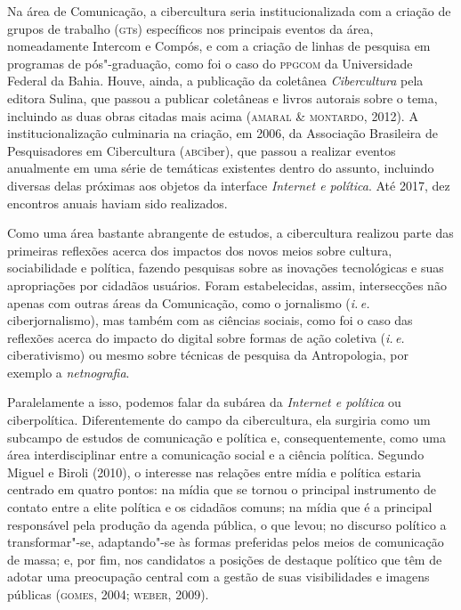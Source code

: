 {Na área de Comunicação, a cibercultura seria institucionalizada com a
criação de grupos de trabalho (\textsc{gt}s) específicos nos principais eventos
da área, nomeadamente Intercom e Compós, e com a criação de linhas de
pesquisa em programas de pós"-graduação, como foi o caso do \textsc{ppgcom} da
Universidade Federal da Bahia. Houve, ainda, a publicação da coletânea
\textit{Cibercultura} pela editora Sulina, que passou a publicar coletâneas e
livros autorais sobre o tema, incluindo as duas obras citadas mais acima
(\textsc{amaral \& montardo}, 2012). A institucionalização culminaria na criação,
em 2006, da Associação Brasileira de Pesquisadores em Cibercultura
(\textsc{abc}iber), que passou a realizar eventos anualmente em uma série de
temáticas existentes dentro do assunto, incluindo diversas delas
próximas aos objetos da interface \textit{Internet e política}. Até 2017, dez
encontros anuais haviam sido realizados.

Como uma área bastante abrangente de estudos, a cibercultura realizou
parte das primeiras reflexões acerca dos impactos dos novos meios sobre
cultura, sociabilidade e política, fazendo pesquisas sobre as inovações
tecnológicas e suas apropriações por cidadãos usuários. Foram
estabelecidas, assim, intersecções não apenas com outras áreas da
Comunicação, como o jornalismo (\textit{i.\,e.} ciberjornalismo), mas também com as
ciências sociais, como foi o caso das reflexões acerca do impacto do
digital sobre formas de ação coletiva (\textit{i.\,e.} ciberativismo) ou mesmo
sobre técnicas de pesquisa da Antropologia, por exemplo a \textit{netnografia}.

Paralelamente a isso, podemos falar da subárea da \textit{Internet e política} 
ou ciberpolítica. Diferentemente do campo da cibercultura,
ela surgiria como um subcampo de estudos de comunicação e política e,
consequentemente, como uma área interdisciplinar entre a comunicação
social e a ciência política. Segundo Miguel e Biroli (2010), o interesse
nas relações entre mídia e política estaria centrado em quatro pontos:
na mídia que se tornou o principal instrumento de contato entre a elite
política e os cidadãos comuns; na mídia que é a principal responsável pela
produção da agenda pública, o que levou; no discurso político a
transformar"-se, adaptando"-se às formas preferidas pelos meios de
comunicação de massa; e, por fim, nos candidatos a posições de destaque político que
têm de adotar uma preocupação central com a gestão de suas visibilidades
e imagens públicas (\textsc{gomes}, 2004; \textsc{weber}, 2009).

}
